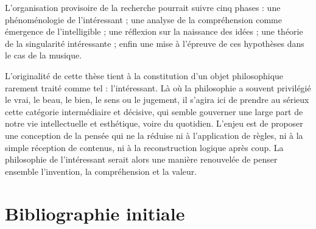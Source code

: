 \documentclass[10pt,a4paper]{article}
\begin{document}
L'organisation provisoire de la recherche pourrait suivre cinq phases : une
phénoménologie de l'intéressant ; une analyse de la compréhension comme émergence
de l'intelligible ; une réflexion sur la naissance des idées ; une théorie de la
singularité intéressante ; enfin une mise à l'épreuve de ces hypothèses dans le
cas de la musique.

L'originalité de cette thèse tient à la constitution d'un objet philosophique
rarement traité comme tel : l'intéressant. Là où la philosophie a souvent
privilégié le vrai, le beau, le bien, le sens ou le jugement, il s'agira ici de
prendre au sérieux cette catégorie intermédiaire et décisive, qui semble gouverner
une large part de notre vie intellectuelle et esthétique, voire du quotidien.
L'enjeu est de proposer une conception de la pensée qui ne la réduise ni à
l'application de règles, ni à la simple réception de contenus, ni à la
reconstruction logique après coup. La philosophie de l'intéressant serait alors
une manière renouvelée de penser ensemble l'invention, la compréhension et la
valeur.

\section*{Bibliographie initiale}
\end{document}
